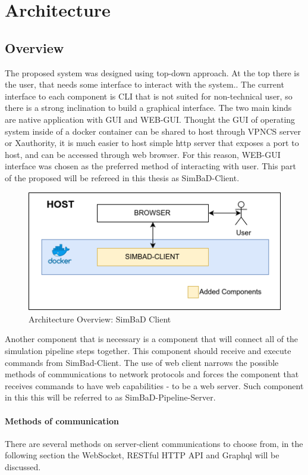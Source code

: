 \chapter{Architecture}
\section{Overview}
The proposed system was designed using top-down approach. At the top there is the user, that needs some interface to interact with the system.. The current interface to each component is CLI that is not suited for non-technical user, so there is a strong inclination to build a graphical interface. The two main kinds are native application with GUI and WEB-GUI. Thought the GUI of operating system inside of a docker container can be shared to host through VPNCS server or Xauthority, it is much easier to host simple http server that exposes a port to host, and can be accessed through web browser. For this reason, WEB-GUI interface was chosen as the preferred method of interacting with user. This part of the proposed will be refereed in this thesis as SimBaD-Client.
\begin{figure}[h!]
	\centering
		\includegraphics[width=0.9\linewidth]{diagrams/arch1.png}
	\caption{Architecture Overview: SimBaD Client}
	\label{fig:arch1}
\end{figure}
Another component that is necessary is a component that will connect all of the simulation pipeline steps together. This component should receive and execute commands from SimBad-Client. The use of web client narrows the possible methods of communications to network protocols and forces the component that receives commands to have web capabilities - to be a web server. Such component in this this will be referred to as SimBaD-Pipeline-Server. 
\subsubsection{Methods of communication}
There are several methods on server-client communications to choose from, in the following section the WebSocket, RESTful HTTP API and Graphql will be discussed.

